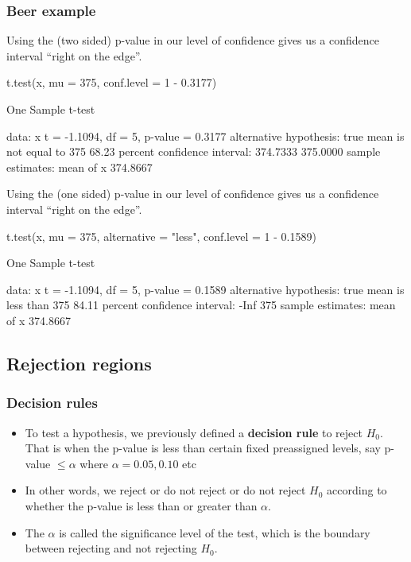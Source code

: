 \documentclass[a4paper]{article}\usepackage[]{graphicx}\usepackage[]{xcolor}
\begin{document}
\subsubsection{Beer example}
Using the (two sided) p-value in our level of confidence gives us a confidence interval ``right on the edge''.
\begin{Schunk}
\begin{Sinput}
t.test(x, mu = 375, conf.level = 1 - 0.3177)
\end{Sinput}
\begin{Soutput}

	One Sample t-test

data:  x
t = -1.1094, df = 5, p-value = 0.3177
alternative hypothesis: true mean is not equal to 375
68.23 percent confidence interval:
 374.7333 375.0000
sample estimates:
mean of x 
 374.8667 
\end{Soutput}
\end{Schunk}
Using the (one sided) p-value in our level of confidence gives us a confidence interval ``right on the edge''.
\begin{Schunk}
\begin{Sinput}
t.test(x, mu = 375, alternative = "less", conf.level = 1 - 0.1589)
\end{Sinput}
\begin{Soutput}

	One Sample t-test

data:  x
t = -1.1094, df = 5, p-value = 0.1589
alternative hypothesis: true mean is less than 375
84.11 percent confidence interval:
 -Inf  375
sample estimates:
mean of x 
 374.8667 
\end{Soutput}
\end{Schunk}
\subsection{Rejection regions}
\subsubsection{Decision rules}
	\begin{itemize}
		\item To test a hypothesis, we previously defined a \textbf{decision rule} to reject \( H_0 \). That is when the p-value is less than certain fixed preassigned levels, say p-value \( \leq \alpha \) where \( \alpha = 0.05, 0.10 \) etc
		\item In other words, we reject or do not reject or do not reject \( H_0 \) according to whether the p-value is less than or greater than \( \alpha \).
		\item The \( \alpha \) is called the significance level of the test, which is the boundary between rejecting and not rejecting \( H_0 \).
	\end{itemize}
\end{document}
